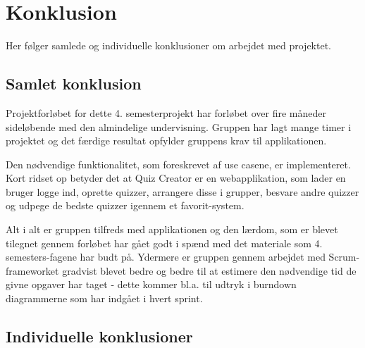 \chapter{Konklusion}
Her følger samlede og individuelle konklusioner om arbejdet med projektet.

\section{Samlet konklusion}
Projektforløbet for dette 4. semesterprojekt har forløbet over fire måneder sideløbende med den almindelige undervisning. Gruppen har lagt mange timer i projektet og det færdige resultat opfylder gruppens krav til applikationen.

Den nødvendige funktionalitet, som foreskrevet af use casene, er implementeret. Kort ridset op betyder det at Quiz Creator er en webapplikation, som lader en bruger logge ind, oprette quizzer, arrangere disse i grupper, besvare andre quizzer og udpege de bedste quizzer igennem et favorit-system.

Alt i alt er gruppen tilfreds med applikationen og den lærdom, som er blevet tilegnet gennem forløbet har gået godt i spænd med det materiale som 4. semesters-fagene har budt på. Ydermere er gruppen gennem arbejdet med Scrum-frameworket gradvist blevet bedre og bedre til at estimere den nødvendige tid de givne opgaver har taget - dette kommer bl.a. til udtryk i burndown diagrammerne som har indgået i hvert sprint. 

\section{Individuelle konklusioner}









